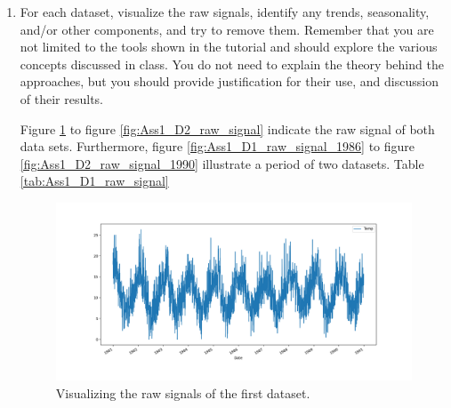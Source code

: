 \documentclass[12pt]{article}
\begin{document}

\pagebreak

\begin{enumerate}



\item For each dataset, visualize the raw signals, identify any trends, seasonality, and/or other components, and try to remove them. Remember that you are not limited to the tools shown in the tutorial and should explore the various concepts discussed in class. You do not need to explain the theory behind the approaches, but you should provide justification for their use, and discussion of their results.


Figure \ref{fig:Ass1_D1_raw_signal} to figure \ref{fig:Ass1_D2_raw_signal} indicate the raw signal of both data sets. Furthermore, figure \ref{fig:Ass1_D1_raw_signal_1986} to figure \ref{fig:Ass1_D2_raw_signal_1990} illustrate a period of two datasets. Table \ref{tab:Ass1_D1_raw_signal}

\begin{figure}[]
    \centering
    \begin{minipage}[b]{1\textwidth}
        \includegraphics[width=\textwidth]{figures/Ass1/Ass1_D1_raw_signal.png}
    \end{minipage}
    \caption{Visualizing the raw signals of the first dataset.}
    \label{fig:Ass1_D1_raw_signal}
\end{figure}


\end{enumerate}
\end{document}

